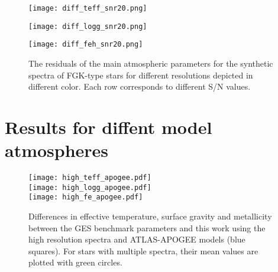 \documentclass[fleqn,usenatbib]{mnras}
\begin{document}
\begin{figure*}%
 \centering
  \begin{minipage}{0.33\textwidth}
  \texttt{[image: diff\_teff\_snr20.png]} 
 \end{minipage}
 \begin{minipage}{0.33\textwidth}
  \texttt{[image: diff\_logg\_snr20.png]} 
 \end{minipage}
 \begin{minipage}{0.33\textwidth}
  \texttt{[image: diff\_feh\_snr20.png]} 
 \end{minipage}
 \caption{The residuals of the main atmospheric parameters for the synthetic spectra of FGK-type stars for different resolutions depicted in different color. 
 Each row corresponds to different S/N values.}
 \label{diff_params}
\end{figure*}


\clearpage
\newpage

\section{Results for diffent model atmospheres}
\vspace{1cm}
\begin{figure}
  \centering
   \texttt{[image: high\_teff\_apogee.pdf]} \\
   \texttt{[image: high\_logg\_apogee.pdf]} \\
   \texttt{[image: high\_fe\_apogee.pdf]}
  \caption{Differences in effective temperature, surface gravity and metallicity between the GES benchmark parameters and this work using the high resolution spectra and ATLAS-APOGEE models 
  (blue squares). For stars with multiple spectra, their mean values are plotted with green circles. }
  \label{high_res_apogee}
  \end{figure}
\end{document}
